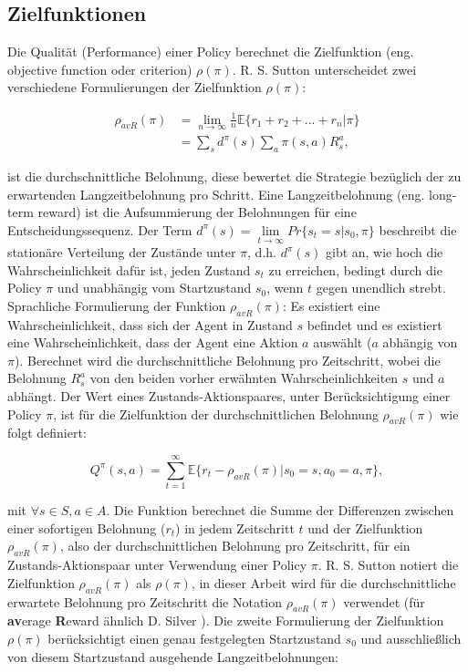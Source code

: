 \documentclass[conference]{IEEEtran}
\begin{document}
\subsection{Zielfunktionen}
Die Qualität (Performance) einer Policy berechnet die Zielfunktion (eng. objective function oder criterion) $\rho(\pi)$. R. S. Sutton \cite{sutton_99} unterscheidet zwei verschiedene Formulierungen der Zielfunktion $\rho(\pi)$: 

\begin{equation*}
\begin{aligned}
\rho_{avR}(\pi) & = \lim\limits_{n \rightarrow \infty}{\frac{1}{n} \mathbb{E}\{r_1 + r_2 + ... + r_n | \pi\}} \\
& = \sum_s d^\pi (s) \sum_a \pi(s,a) R^a_s,
\end{aligned}
\end{equation*}

ist die durchschnittliche Belohnung, diese bewertet die Strategie bezüglich der zu erwartenden Langzeitbelohnung pro Schritt. Eine Langzeitbelohnung (eng. long-term reward) ist die Aufsummierung der Belohnungen für eine Entscheidungssequenz. Der Term $d^\pi(s) = \lim\limits_{t \rightarrow \infty} Pr\{s_t = s|s_0,\pi\}$ beschreibt die stationäre Verteilung der Zustände unter $\pi$, d.h. $d^\pi(s)$ gibt an, wie hoch die Wahrscheinlichkeit dafür ist, jeden Zustand $s_t$ zu erreichen, bedingt durch die Policy $\pi$ und unabhängig vom Startzustand $s_0$, wenn $t$ gegen unendlich strebt. Sprachliche Formulierung der Funktion $\rho_{avR}(\pi)$: Es existiert eine Wahrscheinlichkeit, dass sich der Agent in Zustand $s$ befindet und es existiert eine Wahrscheinlichkeit, dass der Agent eine Aktion $a$ auswählt ($a$ abhängig von $\pi$). Berechnet wird die durchschnittliche Belohnung pro Zeitschritt, wobei die Belohnung $R^a_s$ von den beiden vorher erwähnten Wahrscheinlichkeiten $s$ und $a$ abhängt. Der Wert eines Zustands-Aktionspaares, unter Berücksichtigung einer Policy $\pi$, ist für die Zielfunktion der durchschnittlichen Belohnung $\rho_{avR}(\pi)$ wie folgt definiert:

\begin{equation*}
Q^\pi(s,a) = \sum^\infty_{t=1} \mathbb{E}\{r_t - \rho_{avR}(\pi)|s_0 = s, a_0 = a, \pi\},
\end{equation*}

mit $\forall s \in S, a \in A$. Die Funktion berechnet die Summe der Differenzen zwischen einer sofortigen Belohnung ($r_t$) in jedem Zeitschritt $t$ und der Zielfunktion $\rho_{avR}(\pi)$, also der durchschnittlichen Belohnung pro Zeitschritt, für ein Zustands-Aktionspaar unter Verwendung einer Policy $\pi$. R. S. Sutton notiert die Zielfunktion $\rho_{avR}(\pi)$ als $\rho(\pi)$, in dieser Arbeit wird für die durchschnittliche erwartete Belohnung pro Zeitschritt die Notation $\rho_{avR}(\pi)$ verwendet (für \textbf{av}erage \textbf{R}eward ähnlich D. Silver \cite{silver_15}). Die zweite Formulierung der Zielfunktion $\rho(\pi)$ berücksichtigt einen genau festgelegten Startzustand $s_0$ und ausschließlich von diesem Startzustand ausgehende Langzeitbelohnungen:
\end{document}
